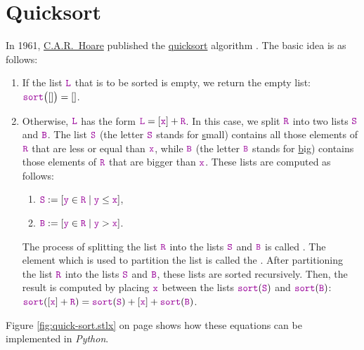 \section{Quicksort}
In 1961, \href{http://en.wikipedia.org/wiki/Tony_Hoare}{C.A.R.~Hoare}  published the
\href{http://en.wikipedia.org/wiki/Quicksort}{quicksort} algorithm \cite{hoare:61}.  
The basic idea is as follows:
\begin{enumerate}
\item If the list $\mytt{L}$ that is to be sorted is empty, we return  the empty list: 
      \\[0.2cm]
      \hspace*{1.3cm} $\mytt{sort}\bigl([]\bigr) = []$.
\item Otherwise, $\mytt{L}$ has the form $\mytt{L} = [\mytt{x}] + \mytt{R}$.  In this case, we split $\mytt{R}$ into two lists $\mytt{S}$ and $\mytt{B}$.
      The list $\mytt{S}$ (the letter $\mytt{S}$ stands for \underline{s}mall) contains all those elements of $\mytt{R}$ that are less
      or equal than $\mytt{x}$,     while $\mytt{B}$ (the letter $\mytt{B}$ stands for \underline{b}ig) contains
      those elements of $\mytt{R}$ that are bigger than $\mytt{x}$.  These lists are computed as follows:
      \begin{enumerate}
      \item $\mytt{S} := [\mytt{y} \in \mytt{R} \mid \mytt{y} \leq \mytt{x}]$,
      \item $\mytt{B} := [\mytt{y} \in \mytt{R} \mid \mytt{y} > \mytt{x}]$.
      \end{enumerate}
      The process of splitting the list $\mytt{R}$ into the lists $\mytt{S}$ and $\mytt{B}$
      is called .  The element  which is used to partition
      the list is called the .
      After partitioning the list $\mytt{R}$ into the lists $\mytt{S}$ and $\mytt{B}$, these lists are sorted 
      recursively.  Then, the result is computed by placing $\mytt{x}$ between the lists $\mytt{sort}(\mytt{S})$ and $\mytt{sort}(\mytt{B})$:
      \\[0.2cm]
      \hspace*{1.3cm}
      $\mytt{sort}([\mytt{x}]+\mytt{R}) = \mytt{sort}(\mytt{S}) + [\mytt{x}] + \mytt{sort}(\mytt{B})$.
\end{enumerate}
Figure \ref{fig:quick-sort.stlx} on page \pageref{fig:quick-sort.stlx} shows how these equations can
be implemented in \textsl{Python}.

